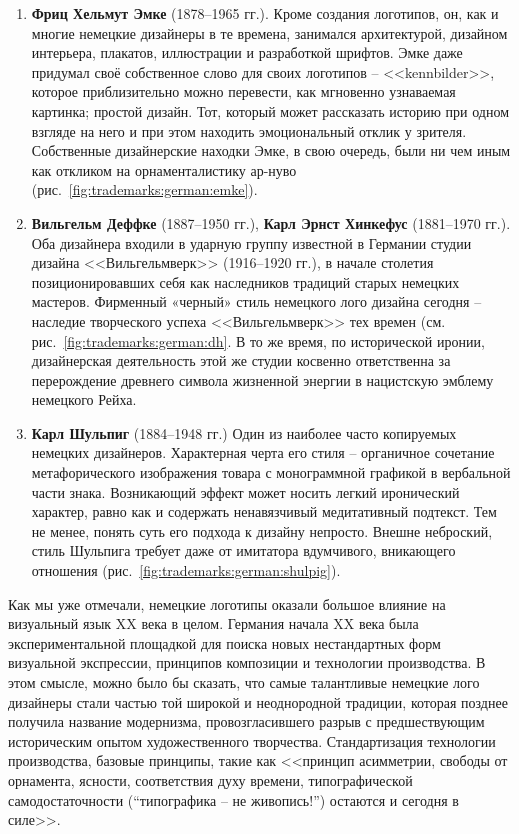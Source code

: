 \begin{enumerate}
\item \textbf{Фриц Хельмут Эмке} (1878--1965 гг.). Кроме создания логотипов, он, как и многие
  немецкие дизайнеры в те времена, занимался архитектурой, дизайном интерьера, плакатов, иллюстрации
  и разработкой шрифтов. Эмке даже придумал своё собственное слово для своих логотипов --
  <<kennbilder>>, которое приблизительно можно перевести, как мгновенно узнаваемая картинка; простой
  дизайн. Тот, который может рассказать историю при одном взгляде на него и при этом находить
  эмоциональный отклик у зрителя. Собственные дизайнерские находки Эмке, в свою очередь, были ни чем
  иным как откликом на орнаменталистику ар-нуво (рис.~\ref{fig:trademarks:german:emke}).
\item \textbf{Вильгельм Деффке} (1887--1950 гг.), \textbf{Карл Эрнст Хинкефус} (1881--1970 гг.). Оба
  дизайнера входили в ударную группу известной в Германии студии дизайна <<Вильгельмверк>> (1916--1920
  гг.), в начале столетия позиционировавших себя как наследников традиций старых немецких
  мастеров. Фирменный «черный» стиль немецкого лого дизайна сегодня -- наследие творческого успеха
  <<Вильгельмверк>> тех времен (см. рис.~\ref{fig:trademarks:german:dh}. В то же время, по
  исторической иронии, дизайнерская деятельность этой же студии косвенно ответственна за перерождение
  древнего символа жизненной энергии в нацистскую эмблему немецкого Рейха.
\item \textbf{Карл Шульпиг} (1884--1948 гг.) Один из наиболее часто копируемых немецких
  дизайнеров. Характерная черта его стиля -- органичное сочетание метафорического изображения товара
  с монограммной графикой в вербальной части знака. Возникающий эффект может носить легкий
  иронический характер, равно как и содержать ненавязчивый медитативный подтекст. Тем не менее,
  понять суть его подхода к дизайну непросто. Внешне неброский, стиль Шульпига требует даже от
  имитатора вдумчивого, вникающего отношения (рис.~\ref{fig:trademarks:german:shulpig}).
\end{enumerate}

Как мы уже отмечали, немецкие логотипы оказали большое влияние на визуальный язык XX века в целом. Германия начала XX века была экспериментальной площадкой для поиска новых нестандартных форм визуальной экспрессии,
принципов композиции и технологии производства. В этом смысле, можно было бы сказать, что самые
талантливые немецкие лого дизайнеры стали частью той широкой и неоднородной традиции, которая
позднее получила название модернизма, провозгласившего разрыв с предшествующим историческим опытом
художественного творчества. Стандартизация технологии производства, базовые принципы, такие как
<<принцип асимметрии, свободы от орнамента, ясности, соответствия духу времени, типографической
самодостаточности (``типографика – не живопись!'') остаются и сегодня в силе>>\autocite[][8]{chihold2011}.

